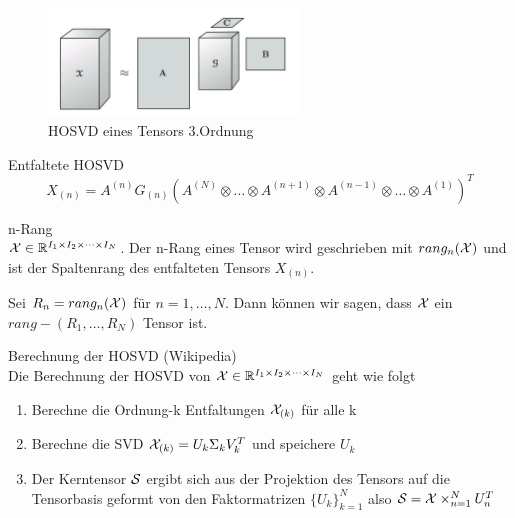 \begin{figure}[ht]
	\centering
  \includegraphics[width=0.6\textwidth]{hosvdTensor.png}
	\caption{HOSVD eines Tensors 3.Ordnung}
	\label{fig:hosvdTensor}
\end{figure}

\begin{Bemerkung} Entfaltete HOSVD \\
\begin{equation}
X_{(n)} = A^{(n)} G_{(n)} ( A^{(N)} \otimes \dots \otimes A^{(n+1)} \otimes A^{(n-1)} \otimes \dots \otimes A^{(1)} )^{T}
\end{equation}
\end{Bemerkung}

\begin{Definition} n-Rang \\
 ${\cal X}  \in \mathbb{R}^{I_1 \times I_2 \times \dots \times I_N}$. Der n-Rang eines Tensor wird geschrieben mit $rang_n({\cal X})$ und ist der Spaltenrang des entfalteten Tensors $X_{(n)}$.
\end{Definition}

\begin{Bemerkung}
Sei $R_n = rang_n({\cal X})$ für $n=1, \dots, N$. Dann können wir sagen, dass ${\cal X}$ ein $rang-(R_1,\dots,R_N)$ Tensor ist.
\end{Bemerkung}

\begin{Bemerkung} Berechnung der HOSVD (Wikipedia) \\
Die Berechnung der HOSVD von ${\cal X}  \in \mathbb{R}^{I_1 \times I_2 \times \dots \times I_N}$ geht wie folgt
\begin{enumerate}
\item Berechne die Ordnung-k Entfaltungen ${\cal X}_{(k)}$ für alle k
\item Berechne die SVD ${\cal X}_{(k)}=U_k \Sigma_k V_k^T$ und speichere $U_k$
\item Der Kerntensor ${\cal S}$ ergibt sich aus der Projektion des Tensors auf die Tensorbasis geformt von den Faktormatrizen  $\{ U_k\}_{k=1}^{N}$  also ${\cal S}={\cal X} \times_{n=1}^{N} U_n^T$
\end{enumerate}
\end{Bemerkung}

